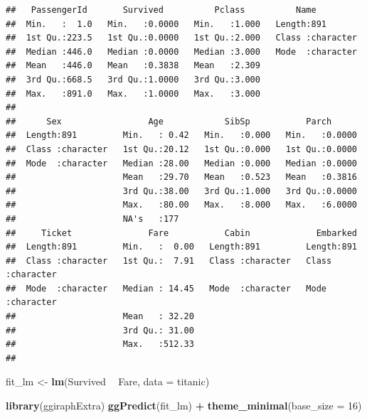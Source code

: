 \documentclass[
  12pt,
]{book}
\newenvironment{Shaded}{\begin{snugshade}}{\end{snugshade}}
\newcommand{\DataTypeTok}[1]{\textcolor[rgb]{0.13,0.29,0.53}{#1}}
\newcommand{\DecValTok}[1]{\textcolor[rgb]{0.00,0.00,0.81}{#1}}
\newcommand{\KeywordTok}[1]{\textcolor[rgb]{0.13,0.29,0.53}{\textbf{#1}}}
\newcommand{\NormalTok}[1]{#1}
\newcommand{\OperatorTok}[1]{\textcolor[rgb]{0.81,0.36,0.00}{\textbf{#1}}}
\newcommand{\StringTok}[1]{\textcolor[rgb]{0.31,0.60,0.02}{#1}}
\theoremstyle{definition}
\theoremstyle{definition}
\theoremstyle{definition}
\theoremstyle{remark}
\begin{document}
\begin{verbatim}
##   PassengerId       Survived          Pclass          Name          
##  Min.   :  1.0   Min.   :0.0000   Min.   :1.000   Length:891        
##  1st Qu.:223.5   1st Qu.:0.0000   1st Qu.:2.000   Class :character  
##  Median :446.0   Median :0.0000   Median :3.000   Mode  :character  
##  Mean   :446.0   Mean   :0.3838   Mean   :2.309                     
##  3rd Qu.:668.5   3rd Qu.:1.0000   3rd Qu.:3.000                     
##  Max.   :891.0   Max.   :1.0000   Max.   :3.000                     
##                                                                     
##      Sex                 Age            SibSp           Parch       
##  Length:891         Min.   : 0.42   Min.   :0.000   Min.   :0.0000  
##  Class :character   1st Qu.:20.12   1st Qu.:0.000   1st Qu.:0.0000  
##  Mode  :character   Median :28.00   Median :0.000   Median :0.0000  
##                     Mean   :29.70   Mean   :0.523   Mean   :0.3816  
##                     3rd Qu.:38.00   3rd Qu.:1.000   3rd Qu.:0.0000  
##                     Max.   :80.00   Max.   :8.000   Max.   :6.0000  
##                     NA's   :177                                     
##     Ticket               Fare           Cabin             Embarked        
##  Length:891         Min.   :  0.00   Length:891         Length:891        
##  Class :character   1st Qu.:  7.91   Class :character   Class :character  
##  Mode  :character   Median : 14.45   Mode  :character   Mode  :character  
##                     Mean   : 32.20                                        
##                     3rd Qu.: 31.00                                        
##                     Max.   :512.33                                        
## 
\end{verbatim}

\begin{Shaded}
\begin{Highlighting}[]
\NormalTok{fit_lm <-}\StringTok{ }\KeywordTok{lm}\NormalTok{(Survived }\OperatorTok{~}\StringTok{ }\NormalTok{Fare, }\DataTypeTok{data =}\NormalTok{ titanic)}
\end{Highlighting}
\end{Shaded}

\begin{Shaded}
\begin{Highlighting}[]
\KeywordTok{library}\NormalTok{(ggiraphExtra)}
\KeywordTok{ggPredict}\NormalTok{(fit_lm) }\OperatorTok{+}\StringTok{ }\KeywordTok{theme_minimal}\NormalTok{(}\DataTypeTok{base_size =} \DecValTok{16}\NormalTok{)}
\end{Highlighting}
\end{Shaded}
\end{document}
